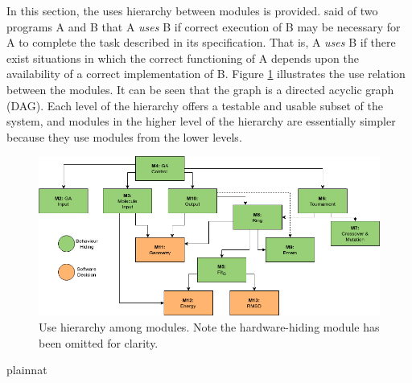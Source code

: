 \documentclass[12pt, titlepage]{article}
\begin{document}
In this section, the uses hierarchy between modules is
provided. \citet{Parnas1978} said of two programs A and B that A {\em uses} B if
correct execution of B may be necessary for A to complete the task described in
its specification. That is, A {\em uses} B if there exist situations in which
the correct functioning of A depends upon the availability of a correct
implementation of B.  Figure \ref{FigUH} illustrates the use relation between
the modules. It can be seen that the graph is a directed acyclic graph
(DAG). Each level of the hierarchy offers a testable and usable subset of the
system, and modules in the higher level of the hierarchy are essentially simpler
because they use modules from the lower levels.

\begin{figure}[H]
\centering
\includegraphics[width=\textwidth]{MG_hierarchy.png}
\caption{Use hierarchy among modules. Note the hardware-hiding module has been 
omitted for clarity.}
\label{FigUH}
\end{figure}



 {plainnat}

\end{document}
